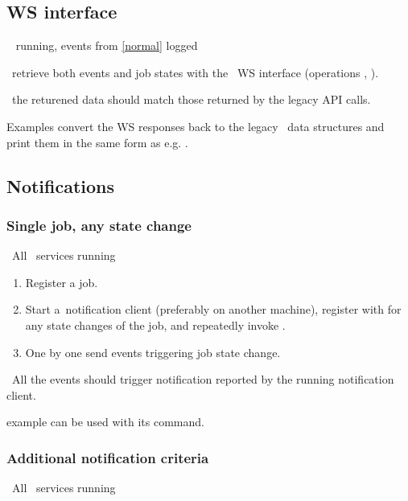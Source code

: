\subsection{WS interface}
\req\  running, events from \ref{normal} logged

\how\ retrieve both events and job states with the \LB\ WS interface
(operations , ).

\result\ the returened data should match those returned by the legacy
API calls.

\begin{hints}
Examples  convert the WS
responses back to the legacy \LB\ data structures and print them in
the same form as e.g. .
\end{hints}

\subsection{Notifications}

\subsubsection{Single job, any state change}
\label{notif1}
\req\ All \LB\ services running

\how
\begin{enumerate}
\item Register a job. 
\item Start a~notification client (preferably on another machine),
register with  for any state changes of the job, 
and repeatedly invoke .
\item One by one send events triggering job state change. 
\end{enumerate}

\result\ All the events should trigger notification reported by the running
notification client.

\begin{hints}
 example can be used with its  command.
\end{hints}

\subsubsection{Additional notification criteria}
\label{notif-complex}
\req\ All \LB\ services running

